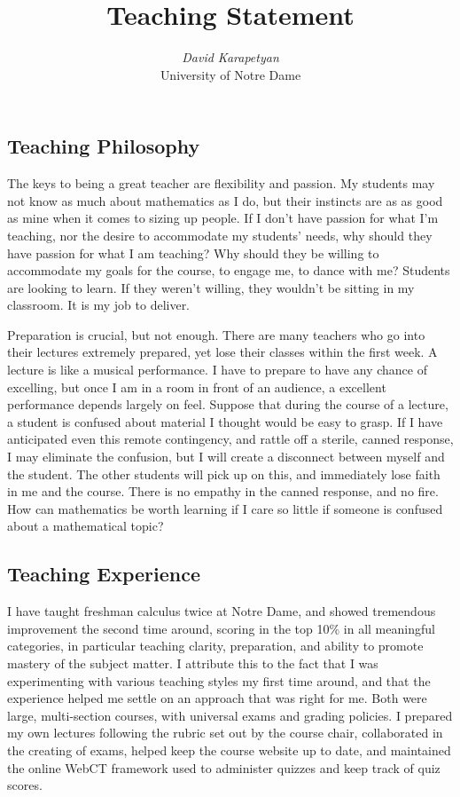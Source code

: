 \documentclass[12pt,oneside]{amsart}
\begin{document}
\title{Teaching Statement}
\author{{\it David Karapetyan}\\
    \/ University of Notre Dame}
\date{}
\maketitle
\thispagestyle{empty} %
\pagestyle{empty} %
\subsection{Teaching Philosophy} The keys to being a great teacher are
flexibility and passion. My students may not know as much about mathematics as
I do, but their instincts are as as good as mine when it comes to sizing up
people. If I don't have passion for what I'm teaching, nor the desire
to accommodate my students' needs, why should they have passion for what I
am teaching? Why should they be willing to accommodate my goals for the
course, to engage me, to dance with me? Students are looking to learn. If they
weren't willing, they wouldn't be sitting in my classroom. It is my job to
deliver.

Preparation is crucial, but not enough. There are many teachers who go into
their lectures extremely prepared, yet lose their classes within the first week.
A lecture is like a musical performance. I have to prepare to have any chance
of excelling, but once I am in a room in front of an audience, a excellent
performance depends largely on feel. Suppose that during the course of a
lecture, a student is confused about material I thought would be easy to
grasp. If I have anticipated even this remote contingency, and rattle off a
sterile, canned response, I may eliminate the confusion, but I will create a
disconnect between myself and the student. The other students will pick up on
this, and immediately lose faith in me and the course. There is no empathy in
the canned response, and no fire. How can mathematics be worth learning if I
care so little if someone is confused about a mathematical topic?   

\subsection{Teaching Experience} I have taught freshman calculus twice at Notre
Dame, and showed tremendous improvement the second time around, scoring in the
top 10\% in all meaningful categories, in particular teaching clarity,
preparation, and ability to promote mastery of the subject matter. I attribute
this to the fact that I was experimenting with various
teaching styles my first time around, and that the experience helped me settle
on an approach that was right for me. Both were large, multi-section courses,
with universal exams and grading policies. I prepared my own lectures following
the rubric set out by the course chair, collaborated in the creating of exams,
helped keep the course website up to date, and maintained the online WebCT
framework used to administer quizzes and keep track of quiz scores.
\end{document}
